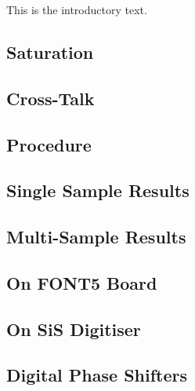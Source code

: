 
This is the introductory text.



\subsection{Saturation}
\label{ss:monSaturation}

\subsection{Cross-Talk}
\label{ss:crossTalk}


\subsection{Procedure}
\label{ss:calProcedure}

\subsection{Single Sample Results}
\label{ss:calSingSamp}

\subsection{Multi-Sample Results}
\label{ss:calMultiSamp}


\subsection{On FONT5 Board}
\label{ss:font5Noise}

\subsection{On SiS Digitiser}
\label{ss:sisNoise}


\subsection{Digital Phase Shifters}
\label{ss:digShiftNoise}

